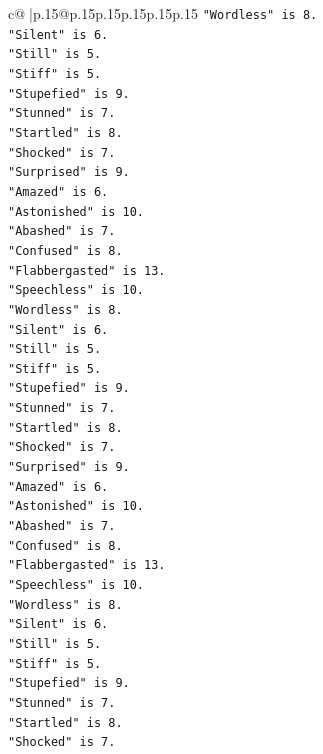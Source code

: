 \documentclass{article}
\begin{document}
{\begin{supertabular}{c@{$\;$}|p{.15\linewidth}@{}p{.15\linewidth}p{.15\linewidth}p{.15\linewidth}p{.15\linewidth}p{.15\linewidth}}
{{{\texttt{"Wordless" is 8.} \\
\texttt{"Silent" is 6.} \\
\texttt{"Still" is 5.} \\
\texttt{"Stiff" is 5.} \\
\texttt{"Stupefied" is 9.} \\
\texttt{"Stunned" is 7.} \\
\texttt{"Startled" is 8.} \\
\texttt{"Shocked" is 7.} \\
\texttt{"Surprised" is 9.} \\
\texttt{"Amazed" is 6.} \\
\texttt{"Astonished" is 10.} \\
\texttt{"Abashed" is 7.} \\
\texttt{"Confused" is 8.} \\
\texttt{"Flabbergasted" is 13.} \\
\texttt{"Speechless" is 10.} \\
\texttt{"Wordless" is 8.} \\
\texttt{"Silent" is 6.} \\
\texttt{"Still" is 5.} \\
\texttt{"Stiff" is 5.} \\
\texttt{"Stupefied" is 9.} \\
\texttt{"Stunned" is 7.} \\
\texttt{"Startled" is 8.} \\
\texttt{"Shocked" is 7.} \\
\texttt{"Surprised" is 9.} \\
\texttt{"Amazed" is 6.} \\
\texttt{"Astonished" is 10.} \\
\texttt{"Abashed" is 7.} \\
\texttt{"Confused" is 8.} \\
\texttt{"Flabbergasted" is 13.} \\
\texttt{"Speechless" is 10.} \\
\texttt{"Wordless" is 8.} \\
\texttt{"Silent" is 6.} \\
\texttt{"Still" is 5.} \\
\texttt{"Stiff" is 5.} \\
\texttt{"Stupefied" is 9.} \\
\texttt{"Stunned" is 7.} \\
\texttt{"Startled" is 8.} \\
\texttt{"Shocked" is 7.} \\
}}}
\end{supertabular}}
\end{document}
